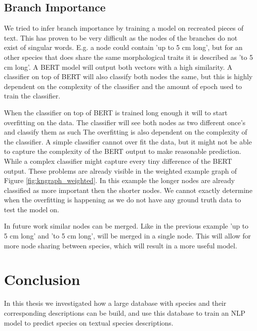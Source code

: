 \documentclass[a4paper, 12pt, oneside]{book} %
\begin{document}
\subsection{Branch Importance}
We tried to infer branch importance by training a model on recreated pieces of text.
This has proven to be very difficult as the nodes of the branches do not exist of singular words.
E.g. a node could contain 'up to 5 cm long', but for an other species that  does share the same morphological traits it is described as 'to 5 cm long'.
A BERT model will output both vectors with a high similarity.
A classifier on top of BERT will also classify both nodes the same, but this is highly dependent on the complexity of the classifier and the amount of epoch used to train the classifier.

When the classifier on top of BERT is trained long enough it will to start overfitting on the data.
The classifier will see both nodes as two different once's and classify them as such
The overfitting is also dependent on the complexity of the classifier. 
A simple classifier cannot over fit the data, but it might not be able to capture the complexity of the BERT output to make reasonable prediction.
While a complex classifier might capture every tiny difference of the BERT output.
These problems are already visible in the weighted example graph of Figure \ref{fig:kngraph_weighted}.
In this example the longer nodes are already classified as more important then the shorter nodes.
We cannot exactly determine when the overfitting is happening as we do not have any ground truth data to test the model on.

In future work similar nodes can be merged.
Like in the previous example 'up to 5 cm long' and 'to 5 cm long', will be merged in a single node.
This will allow for more node sharing between species, which will result in a more useful model.

\newpage
\section{Conclusion} \label{par:conclusion}
In this thesis we investigated how a large database with species and their corresponding descriptions can be build, and use this database to train an NLP model to predict species on textual species descriptions.
\end{document}
